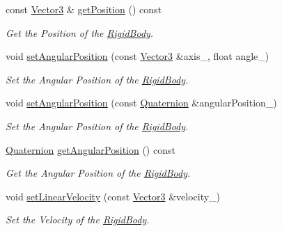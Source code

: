 \begin{DoxyCompactItemize}
const \hyperlink{class_i_dream_sky_1_1_vector3}{Vector3} \& \hyperlink{class_i_dream_sky_1_1_physics3_1_1_rigid_body_ac64063d18bd567bb8684cb67fbe096da}{get\+Position} () const 
\begin{DoxyCompactList}\small\item\em Get the Position of the \hyperlink{class_i_dream_sky_1_1_physics3_1_1_rigid_body}{Rigid\+Body}. \end{DoxyCompactList}\item 
void \hyperlink{class_i_dream_sky_1_1_physics3_1_1_rigid_body_a5d3478baed09428e1ada2ddf8bfa5665}{set\+Angular\+Position} (const \hyperlink{class_i_dream_sky_1_1_vector3}{Vector3} \&axis\+\_\+, float angle\+\_\+)
\begin{DoxyCompactList}\small\item\em Set the Angular Position of the \hyperlink{class_i_dream_sky_1_1_physics3_1_1_rigid_body}{Rigid\+Body}. \end{DoxyCompactList}\item 
void \hyperlink{class_i_dream_sky_1_1_physics3_1_1_rigid_body_aa25cc2bc6ce28df7f1fa6e0393d0bfec}{set\+Angular\+Position} (const \hyperlink{class_i_dream_sky_1_1_quaternion}{Quaternion} \&angular\+Position\+\_\+)
\begin{DoxyCompactList}\small\item\em Set the Angular Position of the \hyperlink{class_i_dream_sky_1_1_physics3_1_1_rigid_body}{Rigid\+Body}. \end{DoxyCompactList}\item 
\hyperlink{class_i_dream_sky_1_1_quaternion}{Quaternion} \hyperlink{class_i_dream_sky_1_1_physics3_1_1_rigid_body_a76bac87573ac41149b925f84e9be00f9}{get\+Angular\+Position} () const 
\begin{DoxyCompactList}\small\item\em Get the Angular Position of the \hyperlink{class_i_dream_sky_1_1_physics3_1_1_rigid_body}{Rigid\+Body}. \end{DoxyCompactList}\item 
void \hyperlink{class_i_dream_sky_1_1_physics3_1_1_rigid_body_a71574b40fa7b726f0304d6b4b902cbed}{set\+Linear\+Velocity} (const \hyperlink{class_i_dream_sky_1_1_vector3}{Vector3} \&velocity\+\_\+)
\begin{DoxyCompactList}\small\item\em Set the Velocity of the \hyperlink{class_i_dream_sky_1_1_physics3_1_1_rigid_body}{Rigid\+Body}. \end{DoxyCompactList}\item 

\end{DoxyCompactItemize}
